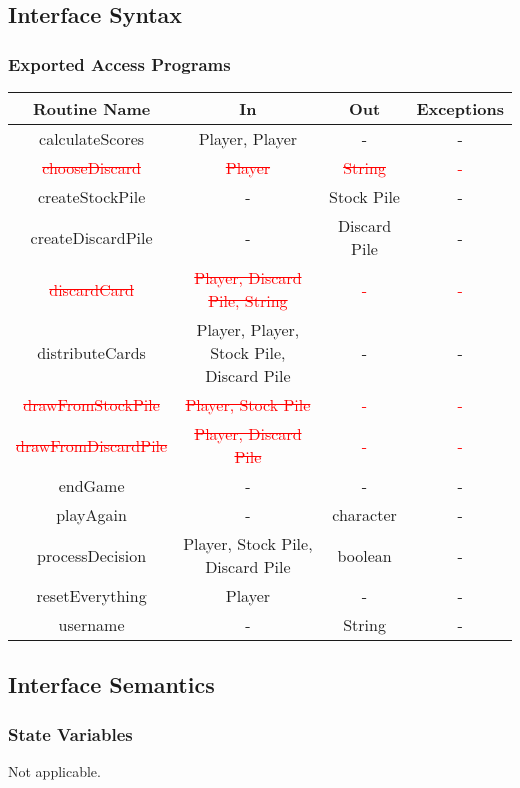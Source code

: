 \documentclass[12pt, titlepage]{article}
\begin{document}
\subsection{Interface Syntax}
\subsubsection{Exported Access Programs}
\begin{tabular}{|c|c|c|c|}
    \hline
    \textbf{Routine Name} & \textbf{In} & \textbf{Out} & \textbf{Exceptions} \\
    \hline
    calculateScores & Player, Player & - & - \\
    \hline
    \textcolor{red}{\sout{chooseDiscard}} & \textcolor{red}{\sout{Player}} & \textcolor{red}{\sout{String}} & \textcolor{red}{-} \\
    \hline
    createStockPile & - & Stock Pile & - \\
    \hline
    createDiscardPile & - & Discard Pile & - \\
    \hline
    \textcolor{red}{\sout{discardCard}} & \textcolor{red}{\sout{Player, Discard Pile, String}} & \textcolor{red}{-} & \textcolor{red}{-} \\
    \hline
    distributeCards & Player, Player, Stock Pile, Discard Pile & - & - \\
    \hline
    \textcolor{red}{\sout{drawFromStockPile}} & \textcolor{red}{\sout{Player, Stock Pile}} & \textcolor{red}{-} & \textcolor{red}{-} \\
    \hline
    \textcolor{red}{\sout{drawFromDiscardPile}} & \textcolor{red}{\sout{Player, Discard Pile}} & \textcolor{red}{-} & \textcolor{red}{-} \\
    \hline
    endGame & - & - & - \\
    \hline
    playAgain & - & character & - \\
    \hline
    processDecision & Player, Stock Pile, Discard Pile & boolean & - \\
    \hline
    resetEverything & Player & - & - \\
    \hline
    username & - & String & - \\
    \hline
\end{tabular}

\subsection{Interface Semantics}
\subsubsection{State Variables}
Not applicable.
\end{document}

